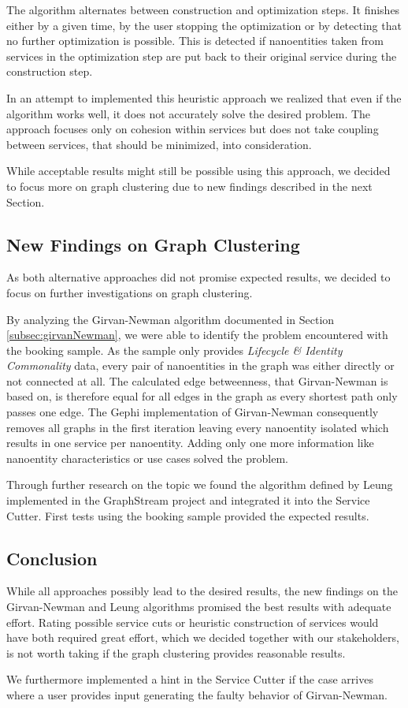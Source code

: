 The algorithm alternates between construction and optimization steps. It finishes either by a given time, by the user stopping the optimization or by detecting that no further optimization is possible. This is detected if nanoentities taken from services in the optimization step are put back to their original service during the construction step.

In an attempt to implemented this heuristic approach we realized that even if the algorithm works well, it does not accurately solve the desired problem. The approach focuses only on cohesion within services but does not take coupling between services, that should be minimized, into consideration.

While acceptable results might still be possible using this approach, we decided to focus more on graph clustering due to new findings described in the next Section.

\subsection{New Findings on Graph Clustering}

As both alternative approaches did not promise expected results, we decided to focus on further investigations on graph clustering. 

By analyzing the Girvan-Newman algorithm documented in Section \ref{subsec:girvanNewman}, we were able to identify the problem encountered with the booking sample. As the sample only provides \textit{Lifecycle \& Identity Commonality} data, every pair of nanoentities in the graph was either directly or not connected at all. The calculated edge betweenness, that Girvan-Newman is based on, is therefore equal for all edges in the graph as every shortest path only passes one edge. The Gephi\cite{gephi} implementation of Girvan-Newman consequently removes all graphs in the first iteration leaving every nanoentity isolated which results in one service per nanoentity. Adding only one more information like nanoentity characteristics or use cases solved the problem.

Through further research on the topic we found the algorithm defined by Leung implemented in the GraphStream\cite{leungGraphstream} project and integrated it into the Service Cutter. First tests using the booking sample provided the expected results.

\subsection{Conclusion}

While all approaches possibly lead to the desired results, the new findings on the Girvan-Newman and Leung algorithms promised the best results with adequate effort. Rating possible service cuts or heuristic construction of services would have both required great effort, which we decided together with our stakeholders, is not worth taking if the graph clustering provides reasonable results. 

We furthermore implemented a hint in the Service Cutter if the case arrives where a user provides input generating the faulty behavior of Girvan-Newman. %